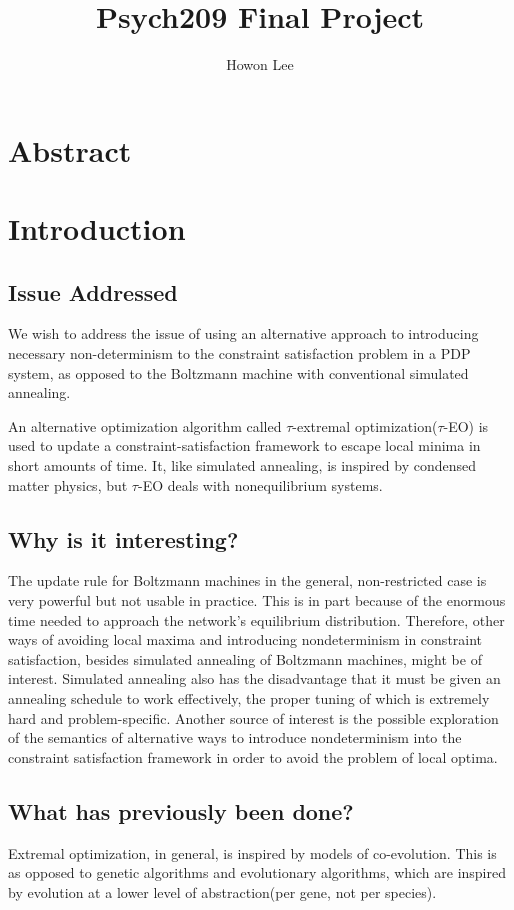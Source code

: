 \documentclass[12pt]{article}
\begin{document}
\title{Psych209 Final Project}
\author{Howon Lee}
\maketitle
\section*{Abstract}
\section*{Introduction}
\subsection*{Issue Addressed}

We wish to address the issue of using an alternative approach to introducing necessary non-determinism to the constraint satisfaction problem in a PDP system, as opposed to the Boltzmann machine with conventional simulated annealing.

An alternative optimization algorithm called $\tau$-extremal optimization($\tau$-EO) is used to update a constraint-satisfaction framework to escape local minima in short amounts of time. It, like simulated annealing, is inspired by condensed matter physics, but $\tau$-EO deals with nonequilibrium systems.

\subsection*{Why is it interesting?}

The update rule for Boltzmann machines in the general, non-restricted case is very powerful but not usable in practice. This is in part because of the enormous time needed to approach the network's equilibrium distribution. Therefore, other ways of avoiding local maxima and introducing nondeterminism in constraint satisfaction, besides simulated annealing of Boltzmann machines, might be of interest. Simulated annealing also has the disadvantage that it must be given an annealing schedule to work effectively, the proper tuning of which is extremely hard and problem-specific. Another source of interest is the possible exploration of the semantics of alternative ways to introduce nondeterminism into the constraint satisfaction framework in order to avoid the problem of local optima.

\subsection*{What has previously been done?}
Extremal optimization, in general, is inspired by models of co-evolution. This is as opposed to genetic algorithms and evolutionary algorithms, which are inspired by evolution at a lower level of abstraction(per gene, not per species).
\end{document}
